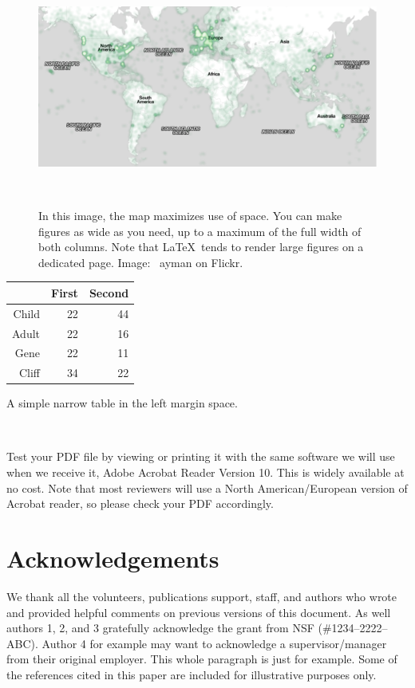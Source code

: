 \documentclass{sigchi-ext}
\begin{document}
\begin{figure}
  \centering
  \includegraphics[width=1.4\columnwidth]{figures/map}
  \caption{In this image, the map maximizes use of space. You can make
    figures as wide as you need, up to a maximum of the full width of
    both columns. Note that \LaTeX\ tends to render large figures on a
    dedicated page. Image: \ccbynd~ayman on Flickr.}~\label{fig:cats}
\end{figure}

\begin{margintable}[1pc]
  \begin{minipage}{\marginparwidth}
    \centering
    \begin{tabular}{r r r}
      & {\small \textbf{First}}
      & {\small \textbf{Second}} \\
      \toprule
      Child & 22 & 44 \\
      Adult & 22 & 16 \\
      \midrule
      Gene & 22 & 11 \\
      Cliff & 34 & 22 \\
      \bottomrule
    \end{tabular}
    \caption{A simple narrow table in the left margin
      space.}~\label{tab:table2}
  \end{minipage}
\end{margintable}
Test your PDF file by viewing or printing it with the same software we
will use when we receive it, Adobe Acrobat Reader Version 10. This is
widely available at no cost. Note that most
reviewers will use a North American/European version of Acrobat
reader, so please check your PDF accordingly.

\section{Acknowledgements}
We thank all the volunteers, publications support, staff, and authors
who wrote and provided helpful comments on previous versions of this
document. As well authors 1, 2, and 3 gratefully acknowledge the grant
from NSF (\#1234--2222--ABC). Author 4 for example may want to
acknowledge a supervisor/manager from their original employer. This
whole paragraph is just for example. Some of the references cited in
this paper are included for illustrative purposes only.
\end{document}
